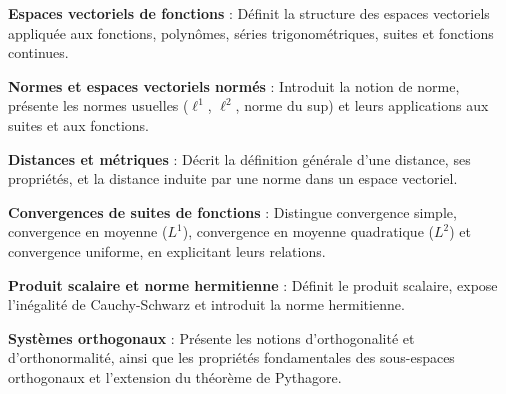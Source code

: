  \label{ch:Quick Summary}

\vspace{2ex} %

\textbf{Espaces vectoriels de fonctions } : Définit la
structure des espaces vectoriels appliquée aux fonctions,
polynômes, séries trigonométriques, suites et fonctions continues.

\textbf{Normes et espaces vectoriels normés } :
Introduit la notion de norme, présente les normes usuelles ($\ell^1$,
$\ell^2$, norme du sup) et leurs applications aux suites et aux fonctions.

\textbf{Distances et métriques } : Décrit la
définition générale d’une distance, ses propriétés, et la distance
induite par une norme dans un espace vectoriel.

\textbf{Convergences de suites de fonctions }
: Distingue convergence simple, convergence en moyenne ($L^1$),
convergence en moyenne quadratique ($L^2$) et convergence uniforme,
en explicitant leurs relations.

\textbf{Produit scalaire et norme hermitienne
} : Définit le produit scalaire, expose
l’inégalité de Cauchy-Schwarz et introduit la norme hermitienne.

\textbf{Systèmes orthogonaux } : Présente les
notions d’orthogonalité et d’orthonormalité, ainsi que les propriétés
fondamentales des sous-espaces orthogonaux et l’extension du théorème
de Pythagore.

